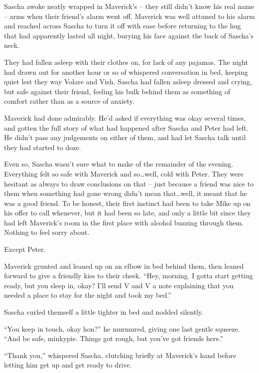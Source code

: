 \secdiv

Sascha awoke neatly wrapped in Maverick's -- they still didn't know his real name -- arms when their friend's alarm went off. Maverick was well attuned to his alarm and reached across Sascha to turn it off with ease before returning to the hug that had apparently lasted all night, burying his face against the back of Sascha's neck.

They had fallen asleep with their clothes on, for lack of any pajamas. The night had drawn out for another hour or so of whispered conversation in bed, keeping quiet lest they way Volare and Vish. Sascha had fallen asleep dressed and crying, but safe against their friend, feeling his bulk behind them as something of comfort rather than as a source of anxiety.

Maverick had done admirably. He'd asked if everything was okay several times, and gotten the full story of what had happened after Sascha and Peter had left. He didn't pass any judgements on either of them, and had let Sascha talk until they had started to doze.

Even so, Sascha wasn't sure what to make of the remainder of the evening. Everything felt so safe with Maverick and so\ldots{}well, cold with Peter. They were hesitant as always to draw conclusions on that -- just because a friend was nice to them when something had gone wrong didn't mean that\ldots{}well, it meant that he was a good friend. To be honest, their first instinct had been to take Mike up on his offer to call whenever, but it had been so late, and only a little bit since they had left Maverick's room in the first place with alcohol buzzing through them. Nothing to feel sorry about.

Except Peter.

Maverick grunted and leaned up on an elbow in bed behind them, then leaned forward to give a friendly kiss to their cheek. ``Hey, morning. I gotta start getting ready, but you sleep in, okay? I'll send V and V a note explaining that you needed a place to stay for the night and took my bed.''

Sascha curled themself a little tighter in bed and nodded silently.

``You keep in touch, okay hon?'' he murmured, giving one last gentle squeeze. ``And be safe, minkypie. Things got rough, but you've got friends here.''

``Thank you,'' whispered Sascha, clutching briefly at Maverick's hand before letting him get up and get ready to drive.


